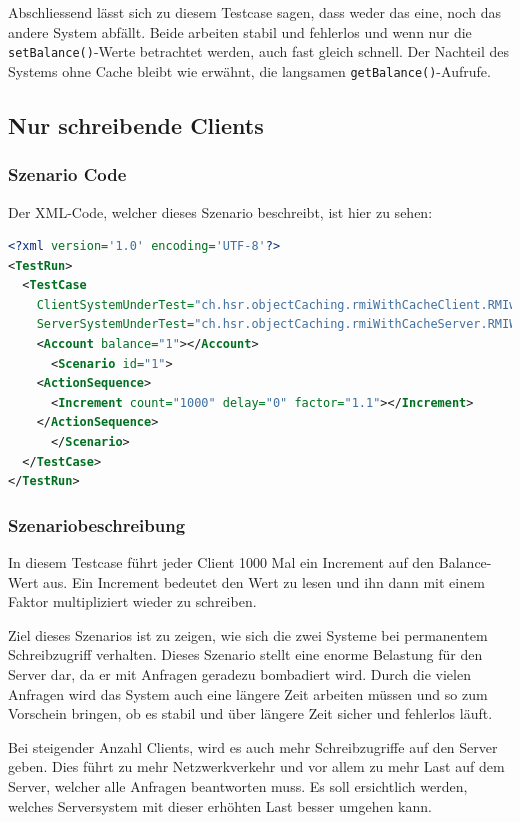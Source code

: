 Abschliessend lässt sich zu diesem Testcase sagen, dass weder das eine, noch das andere System abfällt. Beide arbeiten stabil und fehlerlos und wenn nur die \texttt{setBalance()}-Werte betrachtet werden, auch fast gleich schnell. Der Nachteil des Systems ohne Cache bleibt wie erwähnt, die langsamen \texttt{getBalance()}-Aufrufe.

\subsection{Nur schreibende Clients}
\subsubsection{Szenario Code}
Der XML-Code, welcher dieses Szenario beschreibt, ist hier zu sehen:
\begin{lstlisting}[language=XML, breaklines=true]
<?xml version='1.0' encoding='UTF-8'?>
<TestRun>
  <TestCase
    ClientSystemUnderTest="ch.hsr.objectCaching.rmiWithCacheClient.RMIwithCacheClientSystem"
    ServerSystemUnderTest="ch.hsr.objectCaching.rmiWithCacheServer.RMIWithCacheServerSystem">
    <Account balance="1"></Account>
      <Scenario id="1">
	<ActionSequence>
	  <Increment count="1000" delay="0" factor="1.1"></Increment>
	</ActionSequence>
      </Scenario>
  </TestCase>
</TestRun>
\end{lstlisting}
\subsubsection{Szenariobeschreibung}
In diesem Testcase führt jeder Client 1000 Mal ein Increment auf den Balance-Wert aus. Ein Increment bedeutet den Wert zu lesen und ihn dann mit einem Faktor multipliziert wieder zu schreiben. 

Ziel dieses Szenarios ist zu zeigen, wie sich die zwei Systeme bei permanentem Schreibzugriff verhalten. Dieses Szenario stellt eine enorme Belastung für den Server dar, da er mit Anfragen geradezu bombadiert wird. Durch die vielen Anfragen wird das System auch eine längere Zeit arbeiten müssen und so zum Vorschein bringen, ob es stabil und über längere Zeit sicher und fehlerlos läuft. 

Bei steigender Anzahl Clients, wird es auch mehr Schreibzugriffe auf den Server geben. Dies führt zu mehr Netzwerkverkehr und vor allem zu mehr Last auf dem Server, welcher alle Anfragen beantworten muss. Es soll ersichtlich werden, welches Serversystem mit dieser erhöhten Last besser umgehen kann.

